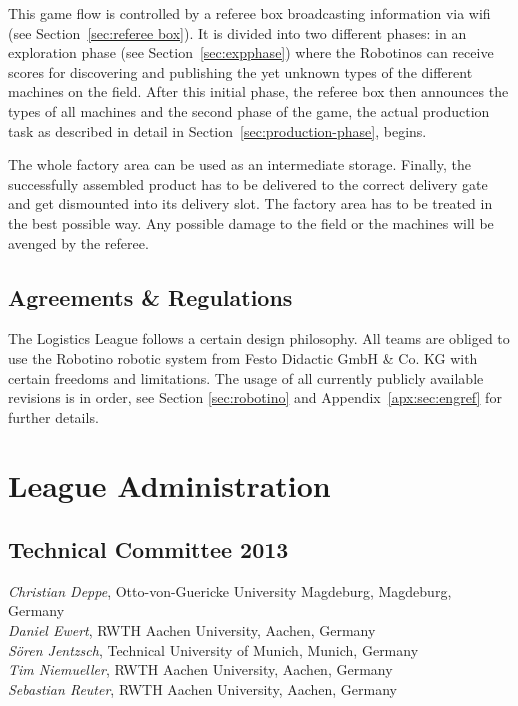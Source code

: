 \documentclass[12pt,twoside]{article}
\newcommand{\refsec}[1]{Section~\ref{#1}}
\begin{document}
This game flow is controlled by a referee box broadcasting information
via wifi (see \refsec{sec:referee box}). It is divided into two different
phases: in an exploration phase (see \refsec{sec:expphase}) where the
Robotinos can receive scores for discovering and publishing the yet
unknown types of the different machines on the field. After this
initial phase, the referee box then announces the types of all
machines and the second phase of the game, the actual production
task as described in detail in \refsec{sec:production-phase}, begins.

The whole factory area can be used as an intermediate
storage. Finally, the successfully assembled product has to be
delivered to the correct delivery gate and get dismounted into its
delivery slot. The factory area has to be treated in the best possible
way. Any possible damage to the field or the machines will be avenged
by the referee.

\subsection{Agreements \& Regulations} \label{sec:agreements}

The Logistics League follows a certain design philosophy. All teams
are obliged to use the Robotino robotic system from Festo Didactic
GmbH \& Co. KG with certain freedoms and limitations. The usage of all
currently publicly available revisions is in order, see Section
\ref{sec:robotino} and Appendix~\ref{apx:sec:engref} for further
details.




\section{League Administration} \label{sec:commitees}
\subsection{Technical Committee 2013} \label{sec:tc}
\emph{Christian Deppe}, Otto-von-Guericke University Magdeburg, Magdeburg,
Germany\\
\emph{Daniel Ewert}, RWTH Aachen University, Aachen, Germany\\
\emph{S\"oren Jentzsch}, Technical University of Munich, Munich, Germany\\
\emph{Tim Niemueller}, RWTH Aachen University, Aachen, Germany\\
\emph{Sebastian Reuter}, RWTH Aachen University, Aachen, Germany
\end{document}
